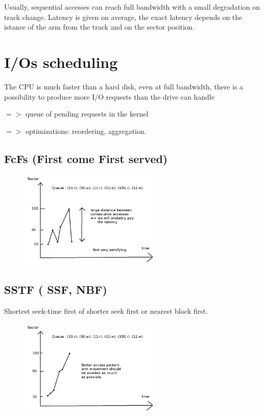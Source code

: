 \documentclass[a4paper,10pt]{article}
\begin{document}
Usually, sequential accesses can reach full bandwidth with a small degradation on track change.
Latency is given on average, the exact latency depends on the istance of the arm from the track and on the sector position.

\section{I/Os scheduling}

The CPU is much faster than a hard disk, even at full bandwidth, there is a possibility to produce more I/O requests than the drive can handle

$=>$ queue of pending requests in the kernel

$=>$ optimizations: reordering, aggregation.

\subsection{FcFs (First come First served)}

\begin{figure}[h!]
  \begin{center}
    \includegraphics[width=0.6\textwidth]{fcfs.png}
  \end{center}
\end{figure}

\subsection{SSTF ( SSF, NBF)}

Shortest seek-time first of shorter seek first or nearest block first.

\begin{figure}[th!]
  \begin{center}
    \includegraphics[width=0.6\textwidth]{sstf.png}
  \end{center}
\end{figure}
\end{document}
